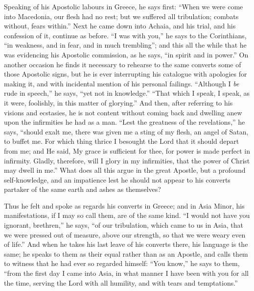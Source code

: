 Speaking of his Apostolic labours in Greece, he says
first: ``When we were come into Macedonia, our flesh
had no rest; but we suffered all tribulation; combats
without, fears within.'' Next he came down into
Achaia, and his trial, and his confession of it, continue
as before. ``I was with you,'' he says to the
Corinthians, ``in weakness, and in fear, and in much
trembling''; and this all the while that he was
evidencing his Apostolic commission, as he says, ``in
spirit and in power.'' On another occasion he finds
it necessary to rehearse to the same converts some of
those Apostolic signs, but he is ever interrupting his
catalogue with apologies for making it, and with
incidental mention of his personal failings.
``Although I \emph{be} rude in speech,'' he says,
``yet not in knowledge.'' ``That which I
speak, I speak, as it were, foolishly, in this matter of
glorying.'' And then, after referring to his visions
and ecstasies, he is not content without coming back and
dwelling anew upon the infirmities he had as a man.
``Lest the greatness of the revelations,'' he
says, ``should exalt me, there was given me a sting
of my flesh, an angel of Satan, to buffet me. For which
thing thrice I besought the Lord that it should depart
from me; and He said, My grace is sufficient for thee,
for power is made perfect in infirmity. Gladly,
therefore, will I glory in my infirmities, that the power
of Christ may dwell in me.'' What does all this argue
in the great Apostle, but a profound self-knowledge, and
an impatience lest he should not appear to his converts
partaker of the same earth and ashes as themselves?

Thus he felt and spoke as regards his converts in
Greece; and in Asia Minor, his manifestations, if I may
so call them, are of the same kind. ``I would not
have you ignorant, brethren,'' he says, ``of our
tribulation, which came to us in Asia, that we were
pressed out of measure, above our strength, so that we
were weary even of life.'' And when he takes his last
leave of his converts there, his language is the same; he
speaks to them as their equal rather than as an Apostle,
and calls them to witness that he had ever so regarded
himself: ``You know,'' he says to them,
``from the first day I came into Asia, in what manner
I have been with you for all the time, serving the Lord
with all humility, and with tears and temptations.''

